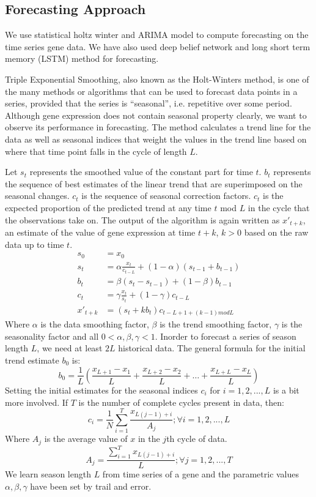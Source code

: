 \subsection{Forecasting Approach}
We use statistical holtz winter and ARIMA model to compute forecasting on the time series gene data. We have also used deep belief network and long short term memory (LSTM) method for forecasting.


Triple Exponential Smoothing, also known as the Holt-Winters method, is one of the many methods or algorithms that can be used to forecast data points in a series, provided that the series is “seasonal”, i.e. repetitive over some period. Although gene expression does not contain seasonal property clearly, we want to observe its performance in forecasting.
The method calculates a trend line for the data as well as seasonal indices that weight the values in the trend line based on where that time point falls in the cycle of length $L$.

Let $s_t$ represents the smoothed value of the constant part for time $t$. $b_t$ represents the sequence of best estimates of the linear trend that are superimposed on the seasonal changes. $c_t$ is the sequence of seasonal correction factors. $c_t$ is the expected proportion of the predicted trend at any time $t$ mod $L$ in the cycle that the observations take on.
The output of the algorithm is again written as $x'_{t+k}$, an estimate of the value of gene expression at time $t+k$, $k>0$ based on the raw data up to time $t$.
\begin{align*}
    s_0 &= x_0  \\
    s_t &= \alpha \frac{x_t}{c_{t-L}}+(1-\alpha)(s_{t-1}+b_{t-1}) \\
    b_t &= \beta(s_t-s_{t-1})+(1-\beta)b_{t-1} \\
    c_t &= \gamma \frac{x_t}{s_t}+(1-\gamma)c_{t-L}\\
    x'_{t+k} &= (s_t+kb_t)c_{t-L+1+(k-1) mod L} 
\end{align*}
Where $\alpha$ is the data smoothing factor, $\beta$ is the trend smoothing factor, $\gamma$ is the seasonality factor and all $0<\alpha,\beta,\gamma<1$. Inorder to forecast a series of season length $L$, we need at least $2L$ historical data. The general formula for the initial trend estimate $b_0$ is:
\begin{equation*}
    b_0 = \frac{1}{L}(\frac{x_{L+1}-x_1}{L}+\frac{x_{L+2}-x_2}{L}+\dots+\frac{x_{L+L}-x_L}{L})
\end{equation*}
Setting the initial estimates for the seasonal indices $c_i$ for $i = 1,2,...,L$ is a bit more involved. If $T$ is the number of complete cycles present in data, then:
\begin{equation*}
    c_i = \frac{1}{N} \sum_{i=1}^{T}\frac{x_{L(j-1)+i}}{A_j}; \forall i = 1,2,...,L
\end{equation*}
Where $A_j$ is the average value of $x$ in the $j$th cycle of  data.
\begin{equation*}
    A_j = \frac{\sum_{i=1}^{T}x_{L(j-1)+i}}{L} ; \forall j = 1,2,...,T
\end{equation*}
We learn season length $L$ from time series of a gene and the parametric values $\alpha, \beta, \gamma$ have been set by trail and error.

